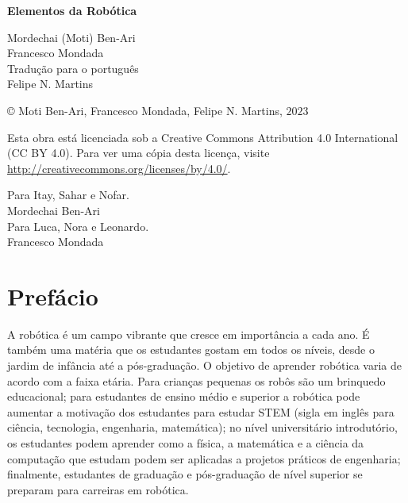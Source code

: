 
\begin{center}
\mbox{}

\vspace{6ex}

\textsf{\bfseries\huge Elementos da Robótica}

\vspace{16ex}

\textsf{\large Mordechai (Moti) Ben-Ari\\[4pt]Francesco Mondada\\[20pt]
Tradução para o português \\[4pt]
Felipe N. Martins}

\end{center}

\vfill

\begin{center}
\copyright{} Moti Ben-Ari, Francesco Mondada, Felipe N. Martins, $2023$
 \end{center}
 
\begin{small}
Esta obra está licenciada sob a Creative Commons Attribution 4.0 International (CC BY 4.0). Para ver uma cópia desta licença, visite \url{http://creativecommons.org/licenses/by/4.0/}.
\end{small}


\newpage
\mbox{}
\vfill
\begin{flushright}
Para Itay, Sahar e Nofar.\\[4pt]
Mordechai Ben-Ari\\[18pt]

Para Luca, Nora e Leonardo.\\[4pt]
Francesco Mondada
\end{flushright}
\vfill
\mbox{}
\newpage

\chapter*{Prefácio}

A robótica é um campo vibrante que cresce em importância a cada ano. É também uma matéria que os estudantes gostam em todos os níveis, desde o jardim de infância até a pós-graduação. O objetivo de aprender robótica varia de acordo com a faixa etária. Para crianças pequenas os robôs são um brinquedo educacional; para estudantes de ensino médio e superior a robótica pode aumentar a motivação dos estudantes para estudar STEM (sigla em inglês para ciência, tecnologia, engenharia, matemática); no nível universitário introdutório, os estudantes podem aprender como a física, a matemática e a ciência da computação que estudam podem ser aplicadas a projetos práticos de engenharia; finalmente, estudantes de graduação e pós-graduação de nível superior se preparam para carreiras em robótica.

